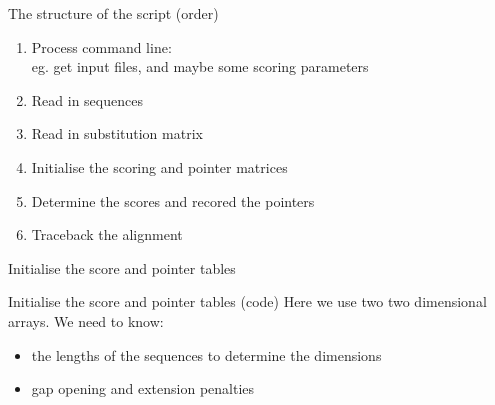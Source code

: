 \documentclass[pdf]{beamer}
\begin{document}
\begin{frame}[fragile]{The structure of the script (order)}
  \begin{enumerate}
  \item Process command line:\\
    eg. get input files, and maybe some scoring parameters
  \item Read in sequences
  \item Read in substitution matrix
  \item Initialise the scoring and pointer matrices
  \item Determine the scores and recored the pointers
  \item Traceback the alignment
  \end{enumerate}
\end{frame}

\begin{frame}[fragile]{Initialise the score and pointer tables}
  \begin{figure}[ht]
    \begin{tikzpicture}[scale=0.5]
      
    \end{tikzpicture}
  \end{figure}
\end{frame}

\begin{frame}[fragile]{Initialise the score and pointer tables (code)}
  \footnotesize
  Here we use two two dimensional arrays. We need to know:
  \begin{itemize}
  \item the lengths of the sequences to determine the dimensions
  \item gap opening and extension penalties
  \end{itemize}

\end{frame}
\end{document}
